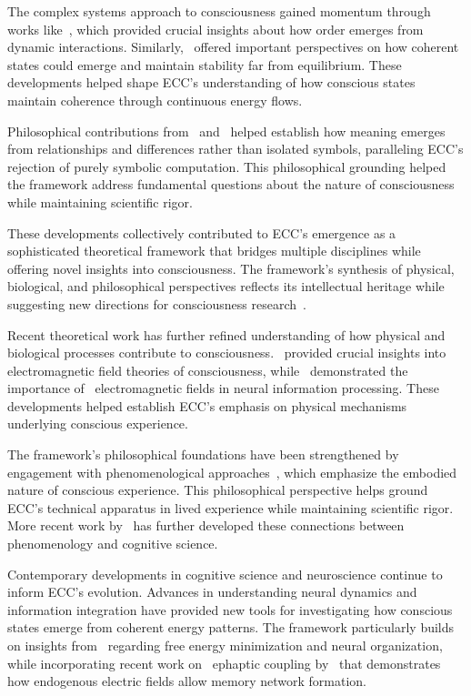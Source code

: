 The complex systems approach to consciousness gained momentum through works like~\cite{kauffman1993origins}, which provided crucial insights about how order emerges from dynamic interactions. Similarly,~\cite{prigogine1984order} offered important perspectives on how coherent states could emerge and maintain stability far from equilibrium. These developments helped shape ECC's understanding of how conscious states maintain coherence through continuous energy flows.

Philosophical contributions from~\cite{levi-strauss1966savage} and~\cite{bourdieu1977outline} helped establish how meaning emerges from relationships and differences rather than isolated symbols, paralleling ECC's rejection of purely symbolic computation. This philosophical grounding helped the framework address fundamental questions about the nature of consciousness while maintaining scientific rigor.

These developments collectively contributed to ECC's emergence as a sophisticated theoretical framework that bridges multiple disciplines while offering novel insights into consciousness. The framework's synthesis of physical, biological, and philosophical perspectives reflects its intellectual heritage while suggesting new directions for consciousness research~\cite{adams1981foundations}.

Recent theoretical work has further refined understanding of how physical and biological processes contribute to consciousness.~\cite{mcfadden2002cemi} provided crucial insights into~ electromagnetic field theories of consciousness, while~\cite{hunt2023fields} demonstrated the importance of~ electromagnetic fields in neural information processing. These developments helped establish ECC's emphasis on physical mechanisms underlying conscious experience.

The framework's philosophical foundations have been strengthened by engagement with phenomenological approaches~\cite{merleau-ponty1962phenomenology}, which emphasize the embodied nature of conscious experience. This philosophical perspective helps ground ECC's technical apparatus in lived experience while maintaining scientific rigor. More recent work by~\cite{gallagher2020phenomenological} has further developed these connections between phenomenology and cognitive science.

Contemporary developments in cognitive science and neuroscience continue to inform ECC's evolution. Advances in understanding neural dynamics and~ information integration have provided new tools for investigating how conscious states emerge from coherent energy patterns. The framework particularly builds on insights from~\cite{friston2010free} regarding free energy minimization and neural organization, while incorporating recent work on~ ephaptic coupling by~\cite{pinotsis2023vivo} that demonstrates how endogenous electric fields allow memory network formation.

